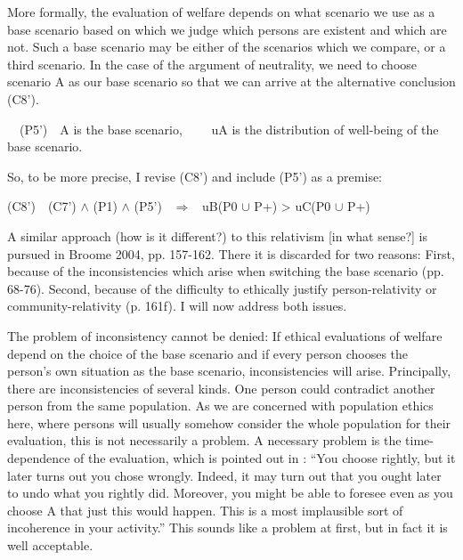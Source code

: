 More formally, the evaluation of welfare depends on what scenario we use as a base scenario based on which we judge which persons are existent and which are not. Such a base scenario may be either of the scenarios which we compare, or a third scenario. In the case of the argument of neutrality, we need to choose scenario A as our base scenario so that we can arrive at the alternative conclusion (C8’). 

\ \ (P5’)\ \ A is the base scenario, \newline \ \ \ \ uA is the distribution of well-being of the base scenario.  

So, to be more precise, I revise (C8’) and include (P5’) as a premise:  

(C8’)\ \ (C7’) ${\wedge}$ (P1) ${\wedge}$ (P5’) \ $\Rightarrow $ \ uB(P0 ${\cup}$ P+) {\textgreater} uC(P0 ${\cup}$ P+) 

A similar approach (how is it different?) to this relativism [in what sense?] is pursued in \label{ref:RNDLLbEezdHvh}Broome 2004, pp. 157-162. There it is discarded for two reasons: First, because of the inconsistencies which arise when switching the base scenario (pp. 68-76). Second, because of the difficulty to ethically justify person-relativity or community-relativity (p. 161f). I will now address both issues.  

The problem of inconsistency cannot be denied: If ethical evaluations of welfare depend on the choice of the base scenario and if every person chooses the person’s own situation as the base scenario, inconsistencies will arise. Principally, there are inconsistencies of several kinds. One person could contradict another person from the same population. As we are concerned with population ethics here, where persons will usually somehow consider the whole population for their evaluation, this is not necessarily a problem. A necessary problem is the time-dependence of the evaluation, which is pointed out in : “You choose rightly, but it later turns out you chose wrongly. Indeed, it may turn out that you ought later to undo what you rightly did. Moreover, you might be able to foresee even as you choose A that just this would happen. This is a most implausible sort of incoherence in your activity.” This sounds like a problem at first, but in fact it is well acceptable.  

